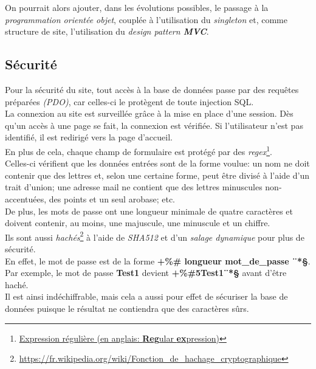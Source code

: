 On pourrait alors ajouter, dans les évolutions possibles, le passage à la \textit{programmation orientée objet}, couplée à l’utilisation du \textit{singleton} et, comme structure de site, l’utilisation du \textit{design pattern \textbf{MVC}}.


\subsection{Sécurité}
\label{subsec:securite}

Pour la sécurité du site, tout accès à la base de données passe par des requêtes préparées \textit{(PDO)}, car celles-ci le protègent de toute injection SQL.\\

La connexion au site est surveillée grâce à la mise en place d’une session. Dès qu’un accès à une page se fait, la connexion est vérifiée. Si l’utilisateur n’est pas identifié, il est redirigé vers la page d’accueil.\\

En plus de cela, chaque champ de formulaire est protégé par des \textit{regex}\footnote{\href{https://fr.wikipedia.org/wiki/Expression\_rationnelle}{Expression régulière (en anglais: \textbf{Reg}ular \textbf{ex}pression)}}.\\
Celles-ci vérifient que les données entrées sont de la forme voulue: un nom ne doit contenir que des lettres et, selon une certaine forme, peut être divisé à l’aide d’un trait d’union; une adresse mail ne contient que des lettres minuscules non-accentuées, des points et un seul arobase; etc.\\

De plus, les mots de passe ont une longueur minimale de quatre caractères et doivent contenir, au moins, une majuscule, une minuscule et un chiffre.\\
Ils sont aussi \textit{hachés}\footnote{\url{https://fr.wikipedia.org/wiki/Fonction\_de\_hachage\_cryptographique}} à l’aide de \textit{SHA512} et d’un \textit{salage dynamique} pour plus de sécurité.\\
En effet, le mot de passe est de la forme \textbf{+\%\# longueur mot\_de\_passe  ¨*§}.\\ Par exemple, le mot de passe \textbf{Test1} devient \textbf{+\%\#5Test1¨*§} avant d’être haché.\\
Il est ainsi indéchiffrable, mais cela a aussi pour effet de sécuriser la base de données puisque le résultat ne contiendra que des caractères sûrs.



